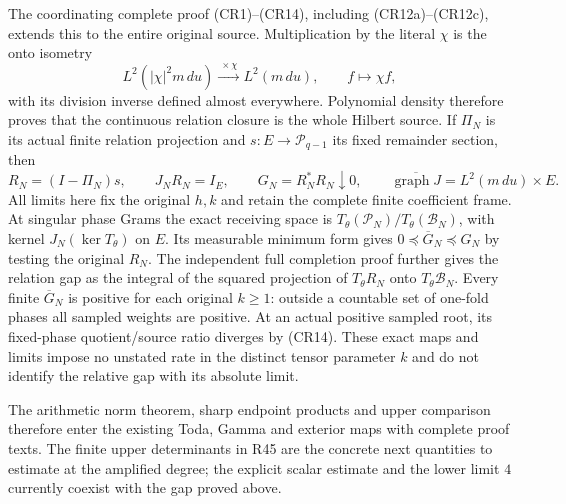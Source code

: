 The coordinating complete proof (CR1)--(CR14), including (CR12a)--(CR12c),
extends this to the entire original source. Multiplication by the
literal $\chi$ is the onto isometry
\[
 L^2(|\chi|^2m\,du)\xrightarrow{\ \times\chi\ }L^2(m\,du),
 \qquad f\longmapsto\chi f,
\]
with its division inverse defined almost everywhere. Polynomial
density therefore proves that the continuous relation closure is
the whole Hilbert source. If $\Pi_N$ is its actual finite relation
projection and $s:E\to\mathcal P_{q-1}$ its fixed remainder section,
then
\[
 R_N=(I-\Pi_N)s,\qquad J_NR_N=I_E,\qquad
 G_N=R_N^*R_N\downarrow0,
 \qquad\overline{\operatorname{graph}J}=L^2(m\,du)\times E.
\]
All limits here fix the original $h,k$ and retain the complete
finite coefficient frame. At singular phase Grams the exact
receiving space is $T_\theta(\mathcal P_N)/T_\theta(\mathcal B_N)$,
with kernel $J_N(\ker T_\theta)$ on $E$. Its measurable minimum
form gives $0\preceq\overline G_N\preceq G_N$ by testing the
original $R_N$. The independent full completion proof further
gives the relation gap as the integral of the squared projection
of $T_\theta R_N$ onto $T_\theta\mathcal B_N$. Every finite
$\overline G_N$ is positive for each original $k\ge1$: outside
a countable set of one-fold phases all sampled weights are
positive. At an actual positive sampled root, its fixed-phase
quotient/source ratio diverges by (CR14). These exact maps and
limits impose no unstated rate in the distinct tensor parameter
$k$ and do not identify the relative gap with its absolute limit.


The arithmetic norm theorem, sharp endpoint products and upper
comparison therefore enter the existing Toda, Gamma and exterior
maps with complete proof texts. The finite upper determinants in
R45 are the concrete next quantities to estimate at the amplified
degree; the explicit scalar estimate and the lower limit $4$
currently coexist with the gap proved above.
